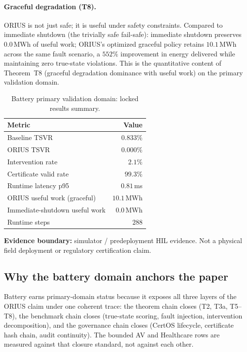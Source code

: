 \paragraph{Graceful degradation (T8).}
ORIUS is not just safe; it is useful under safety constraints.
Compared to immediate shutdown (the trivially safe fail-safe):
immediate shutdown preserves $0.0$\,MWh of useful work;
ORIUS's optimized graceful policy retains $10.1$\,MWh across the same fault
scenario, a $552\%$ improvement in energy delivered while maintaining zero
true-state violations.
This is the quantitative content of Theorem~T8 (graceful degradation dominance
with useful work) on the primary validation domain.

\begin{table}[t]
\centering
\caption{Battery primary validation domain: locked results summary.}
\label{tab:ieee-battery-witness}
\small
\begin{tabularx}{\columnwidth}{@{}p{}r@{}}
\toprule
\textbf{Metric} & \textbf{Value}\\
\midrule
Baseline TSVR              & $0.833\%$ \\
ORIUS TSVR                 & $0.000\%$ \\
Intervention rate          & $2.1\%$ \\
Certificate valid rate     & $99.3\%$ \\
Runtime latency p95        & $0.81$\,ms \\
ORIUS useful work (graceful) & $10.1$\,MWh \\
Immediate-shutdown useful work & $0.0$\,MWh \\
Runtime steps              & $288$ \\
\bottomrule
\end{tabularx}
{\footnotesize
  \textbf{Evidence boundary:} simulator / predeployment HIL evidence.
  Not a physical field deployment or regulatory certification claim.
}
\end{table}

\subsection{Why the battery domain anchors the paper}
Battery earns primary-domain status because it exposes all three layers of the
ORIUS claim under one coherent trace: the theorem chain closes (T2, T3a, T5--T8),
the benchmark chain closes (true-state scoring, fault injection, intervention
decomposition), and the governance chain closes (CertOS lifecycle, certificate
hash chain, audit continuity).  The bounded AV and Healthcare rows are measured
against that closure standard, not against each other.
